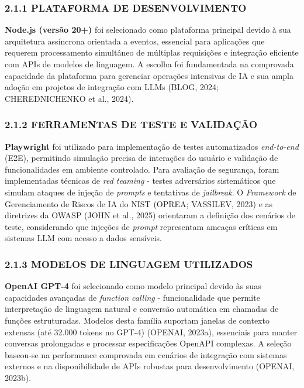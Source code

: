 \documentclass[
]{article}
\begin{document}
\subsubsection{2.1.1 PLATAFORMA DE
DESENVOLVIMENTO}\label{plataforma-de-desenvolvimento}

\textbf{Node.js (versão 20+)} foi selecionado como plataforma principal
devido à sua arquitetura assíncrona orientada a eventos, essencial para
aplicações que requerem processamento simultâneo de múltiplas
requisições e integração eficiente com APIs de modelos de linguagem. A
escolha foi fundamentada na comprovada capacidade da plataforma para
gerenciar operações intensivas de IA e sua ampla adoção em projetos de
integração com LLMs (BLOG, 2024; CHEREDNICHENKO et al., 2024).

\subsubsection{2.1.2 FERRAMENTAS DE TESTE E
VALIDAÇÃO}\label{ferramentas-de-teste-e-validauxe7uxe3o}

\textbf{Playwright} foi utilizado para implementação de testes
automatizados \emph{end-to-end} (E2E), permitindo simulação precisa de
interações do usuário e validação de funcionalidades em ambiente
controlado. Para avaliação de segurança, foram implementadas técnicas de
\emph{red teaming} - testes adversários sistemáticos que simulam ataques
de injeção de \emph{prompts} e tentativas de \emph{jailbreak}. O
\emph{Framework} de Gerenciamento de Riscos de IA do NIST (OPREA;
VASSILEV, 2023) e as diretrizes da OWASP (JOHN et al., 2025) orientaram
a definição dos cenários de teste, considerando que injeções de
\emph{prompt} representam ameaças críticas em sistemas LLM com acesso a
dados sensíveis.

\subsubsection{2.1.3 MODELOS DE LINGUAGEM
UTILIZADOS}\label{modelos-de-linguagem-utilizados}

\textbf{OpenAI GPT-4} foi selecionado como modelo principal devido às
suas capacidades avançadas de \emph{function calling} - funcionalidade
que permite interpretação de linguagem natural e conversão automática em
chamadas de funções estruturadas. Modelos desta família suportam janelas
de contexto extensas (até 32.000 tokens no GPT-4) (OPENAI, 2023a),
essenciais para manter conversas prolongadas e processar especificações
OpenAPI complexas. A seleção baseou-se na performance comprovada em
cenários de integração com sistemas externos e na disponibilidade de
APIs robustas para desenvolvimento (OPENAI, 2023b).
\end{document}
